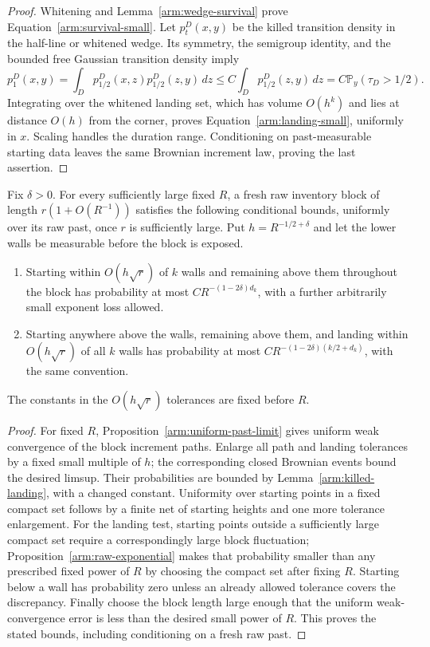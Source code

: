 \begin{proof}
Whitening and Lemma~\ref{arm:wedge-survival} prove
Equation~\eqref{arm:survival-small}.  Let $p_t^D(x,y)$ be the killed
transition density in the half-line or whitened wedge.  Its symmetry,
the semigroup identity, and the bounded free Gaussian transition
density imply
\[
 p_1^D(x,y)
 =\int_Dp_{1/2}^D(x,z)p_{1/2}^D(z,y)\,dz
 \le C\int_Dp_{1/2}^D(z,y)\,dz
 =C\mathbb P_y(\tau_D>1/2).
\]
Integrating over the whitened landing set, which has volume $O(h^k)$
and lies at distance $O(h)$ from the corner, proves
Equation~\eqref{arm:landing-small}, uniformly in $x$.
Scaling handles the duration range.  Conditioning on past-measurable
starting data leaves the same Brownian increment law, proving the last
assertion.
\end{proof}

\begin{lemma}\label{arm:lattice-slots}
Fix $\delta>0$.  For every sufficiently large fixed $R$, a fresh raw
inventory block of length $r(1+O(R^{-1}))$ satisfies the following
conditional bounds, uniformly over its raw past, once $r$ is sufficiently
large.  Put $h=R^{-1/2+\delta}$ and let the lower walls be measurable
before the block is exposed.
\begin{enumerate}[label=(\roman*)]
 \item Starting within $O(h\sqrt r)$ of $k$ walls and remaining above
       them throughout the block has probability at most
       $C R^{-(1-2\delta)d_k}$, with a further arbitrarily small
       exponent loss allowed.
 \item Starting anywhere above the walls, remaining above them, and
       landing within $O(h\sqrt r)$ of all $k$ walls has probability
       at most $C R^{-(1-2\delta)(k/2+d_k)}$, with the same convention.
\end{enumerate}
The constants in the $O(h\sqrt r)$ tolerances are fixed before $R$.
\end{lemma}

\begin{proof}
For fixed $R$, Proposition~\ref{arm:uniform-past-limit} gives uniform
weak convergence of the block increment paths.  Enlarge all path and
landing tolerances by a fixed small multiple of $h$; the corresponding
closed Brownian events bound the desired limsup.  Their probabilities
are bounded by Lemma~\ref{arm:killed-landing}, with a changed constant.
Uniformity over starting points in a fixed compact set follows by a
finite net of starting heights and one more tolerance enlargement.
For the landing test, starting points outside a sufficiently large
compact set require a correspondingly large block fluctuation;
Proposition~\ref{arm:raw-exponential} makes that probability smaller
than any prescribed fixed power of $R$ by choosing the compact set
after fixing $R$.  Starting below a wall has probability zero unless
an already allowed tolerance covers the discrepancy.  Finally choose
the block length large enough that the uniform weak-convergence error
is less than the desired small power of $R$.  This proves the stated
bounds, including conditioning on a fresh raw past.
\end{proof}


